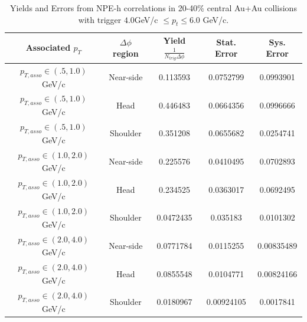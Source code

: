 \begin{table}
\centering
\begin{tabular}{|c|c|c|c|c|}
\hline
Associated $p_T$	& $\Delta\phi$ region & Yield $\frac{1}{N_{trig} \Delta\phi}$ & Stat. Error & Sys. Error\\
\hline
$p_{T,asso} \in(.5, 1.0)$ GeV/c  & Near-side & 0.113593 & 0.0752799 & 0.0993901 \\
\hline
$p_{T,asso} \in(.5, 1.0)$ GeV/c  & Head & 0.446483 & 0.0664356 & 0.0996666 \\
\hline
$p_{T,asso} \in(.5, 1.0)$ GeV/c  & Shoulder & 0.351208 & 0.0655682 & 0.0254741 \\
\hline
$p_{T,asso} \in(1.0, 2.0)$ GeV/c  & Near-side & 0.225576 & 0.0410495 & 0.0702893 \\
\hline
$p_{T,asso} \in(1.0, 2.0)$ GeV/c  & Head & 0.234525 & 0.0363017 & 0.0692495 \\
\hline
$p_{T,asso} \in(1.0, 2.0)$ GeV/c  & Shoulder & 0.0472435 & 0.035183 & 0.0101302 \\
\hline
$p_{T,asso} \in(2.0, 4.0)$ GeV/c  & Near-side & 0.0771784 & 0.0115255 & 0.00835489 \\
\hline
$p_{T,asso} \in(2.0, 4.0)$ GeV/c  & Head & 0.0855548 & 0.0104771 & 0.00824166 \\
\hline
$p_{T,asso} \in(2.0, 4.0)$ GeV/c  & Shoulder & 0.0180967 & 0.00924105 & 0.0017841 \\
\hline
\end{tabular}
\caption[Yields and Errors in Au+Au Correlations, 20-40\%, Low Trigger]{Yields and Errors from NPE-h correlations in 20-40\% central Au+Au collisions with trigger $4.0 $GeV/c $\leq p_t \leq 6.0$ GeV/c.}
\label{tab:AuAuYieldMidLow}
\end{table} 

